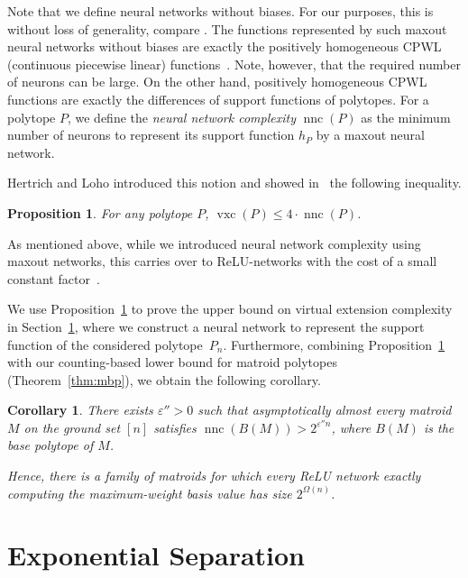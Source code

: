 \documentclass[centering,11pt,reqno]{amsart}
\newtheorem{cor}[theorem]{Corollary}
\newtheorem{prop}[theorem]{Proposition}
\theoremstyle{definition}
\DeclareMathOperator{\vxc}{vxc}
\DeclareMathOperator{\nnc}{nnc}
\newcommand{\defn}[1]{\emph{#1}}
\begin{document}
Note that we define neural networks without biases. For our purposes, this is without loss of generality, compare \cite[Remark~2.1]{VirtualExtensions}.
The functions represented by such maxout neural networks without biases are exactly the positively homogeneous CPWL (continuous piecewise linear) functions~\cite{Arora2018}. Note, however, that the required number of neurons can be large.
On the other hand, positively homogeneous CPWL functions are exactly the differences of support functions of polytopes.
For a polytope $P$, we define the \defn{neural network complexity} $\nnc(P)$ as the minimum number of neurons to represent its support function $h_P$ by a maxout neural network.

Hertrich and Loho introduced this notion and showed in~\cite[Theorem~4.1]{VirtualExtensions} the following inequality.
\begin{prop} \label{prop:vxc-nnc}
    For any polytope $P$, $\vxc(P)\le4\cdot\nnc(P)$.
\end{prop}

As mentioned above, while we introduced neural network complexity using maxout networks, this carries over to ReLU-networks with the cost of a small constant factor~\cite[Remark~2.2]{VirtualExtensions}. 


We use Proposition~\ref{prop:vxc-nnc} to prove the upper bound on virtual extension complexity in Section~\ref{sec:exponential-separation}, where we construct a neural network to represent the support function of the considered polytope~$P_n$. Furthermore, combining Proposition~\ref{prop:vxc-nnc} with our counting-based lower bound for matroid polytopes (Theorem~\ref{thm:mbp}), we obtain the following corollary.

\begin{cor}\label{cor:nnc}
    There exists $\varepsilon''>0$ such that asymptotically almost every matroid $M$ on the ground set $[n]$ satisfies $\nnc(B(M))>2^{\varepsilon'' n}$, where $B(M)$ is the base polytope of $M$.

    Hence, there is a family of matroids for which every ReLU network exactly computing the maximum-weight basis value has size $2^{\Omega(n)}$.
\end{cor}







\section{Exponential Separation}
\label{sec:exponential-separation}
\end{document}
